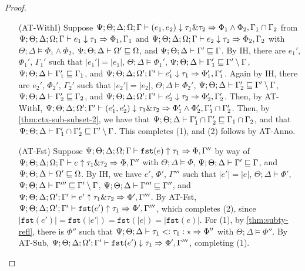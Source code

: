 \begin{proof}
\begin{itemize}
 
 \item[(AT-WithI)] Suppose $\Psi ; \Theta ; \Delta ; \Omega ; \Gamma \vdash (e_1,e_2) \downarrow \tau_1 \& \tau_2 \Rightarrow \Phi_1 \wedge \Phi_2, \Gamma_1 \cap \Gamma_2$
 from $\Psi ; \Theta ; \Delta ; \Omega ; \Gamma \vdash e_1 \downarrow \tau_1 \Rightarrow \Phi_1, \Gamma_1$ and 
 $\Psi ; \Theta ; \Delta ; \Omega ; \Gamma \vdash e_2 \downarrow \tau_2 \Rightarrow \Phi_2, \Gamma_2$ with 
 $\Theta ; \Delta \vDash \Phi_1 \wedge \Phi_2$,
 $\Psi ; \Theta ; \Delta \vdash \Omega' \sqsubseteq \Omega$, and
 $\Psi ; \Theta ; \Delta \vdash \Gamma' \sqsubseteq \Gamma$.
 By IH, there are $e_1'$, $\Phi_1'$, $\Gamma_1'$ such that
 $|e_1'| = |e_1|$,
 $\Theta ; \Delta \vDash \Phi_1'$,
 $\Psi ; \Theta ; \Delta \vdash \Gamma_1' \sqsubseteq \Gamma' \setminus \Gamma$,
 $\Psi ; \Theta ; \Delta \vdash \Gamma_1' \sqsubseteq \Gamma_1$, and
 $\Psi ; \Theta ; \Delta ; \Omega' ; \Gamma' \vdash e_1' \downarrow \tau_1 \Rightarrow \Phi_1', \Gamma_1'$.
 Again by IH, there are $e_2'$, $\Phi_2'$, $\Gamma_2'$ such that
 $|e_2'| = |e_2|$,
 $\Theta ; \Delta \vDash \Phi_2'$,
 $\Psi ; \Theta ; \Delta \vdash \Gamma_2' \sqsubseteq \Gamma' \setminus \Gamma$,
 $\Psi ; \Theta ; \Delta \vdash \Gamma_2' \sqsubseteq \Gamma_2$, and
 $\Psi ; \Theta ; \Delta ; \Omega' ; \Gamma' \vdash e_2' \downarrow \tau_2 \Rightarrow \Phi_2', \Gamma_2'$.
 Then, by AT-WithI, 
 $\Psi ; \Theta ; \Delta ; \Omega' ; \Gamma' \vdash (e_1',e_2') \downarrow \tau_1 \& \tau_2 \Rightarrow \Phi_1' \wedge \Phi_2', \Gamma_1' \cap \Gamma_2'$.
 Then, by \autoref{thm:ctx-sub-subset-2}, we have that $\Psi ; \Theta ; \Delta \vdash \Gamma_1' \cap \Gamma_2' \sqsubseteq \Gamma_1 \cap \Gamma_2$,
 and that $\Psi ; \Theta ; \Delta \vdash \Gamma_1' \cap \Gamma_2' \sqsubseteq \Gamma' \setminus \Gamma$. This completes (1), and (2) follows by AT-Anno.
  
  
  \item[(AT-Fst)] Suppose $\Psi ; \Theta ; \Delta ; \Omega ; \Gamma \vdash \texttt{fst}(e) \uparrow \tau_1 \Rightarrow \Phi,\Gamma''$ by way of
  $\Psi ; \Theta ; \Delta ; \Omega ; \Gamma \vdash e \uparrow \tau_1 \& \tau_2 \Rightarrow \Phi,\Gamma''$
  with $\Theta ; \Delta \vDash \Phi$,
  $\Psi ; \Theta ; \Delta \vdash \Gamma' \sqsubseteq \Gamma$, and
  $\Psi ; \Theta ; \Delta \vdash \Omega' \sqsubseteq \Omega$.
  By IH, we have $e'$, $\Phi'$, $\Gamma'''$ such that
  $|e'| = |e|$,
  $\Theta ; \Delta \vDash \Phi'$,
  $\Psi ; \Theta ; \Delta \vdash \Gamma''' \sqsubseteq \Gamma' \setminus \Gamma$,
  $\Psi ; \Theta ; \Delta \vdash \Gamma''' \sqsubseteq \Gamma''$, and
  $\Psi ; \Theta ; \Delta ; \Omega' ; \Gamma' \vdash e' \uparrow \tau_1 \& \tau_2 \Rightarrow \Phi',\Gamma'''$.
  By AT-Fst, $\Psi ; \Theta ; \Delta ; \Omega' ; \Gamma' \vdash \texttt{fst}(e') \uparrow \tau_1 \Rightarrow \Phi',\Gamma'''$,
  which completes (2), since $|\texttt{fst}(e')| = \texttt{fst}(|e'|) = \texttt{fst}(|e|) = |\texttt{fst}(e)|$. For (1),
  by \autoref{thm:subty-refl}, there is $\Phi''$ such that $\Psi ; \Theta ; \Delta \vdash \tau_1 <: \tau_1 : \star \Rightarrow \Phi''$ with $\Theta ; \Delta \vDash \Phi''$. By AT-Sub, $\Psi ; \Theta ; \Delta ; \Omega' ; \Gamma' \vdash \texttt{fst}(e') \downarrow \tau_1 \Rightarrow \Phi',\Gamma'''$, completing (1).


\end{itemize}
\end{proof}
